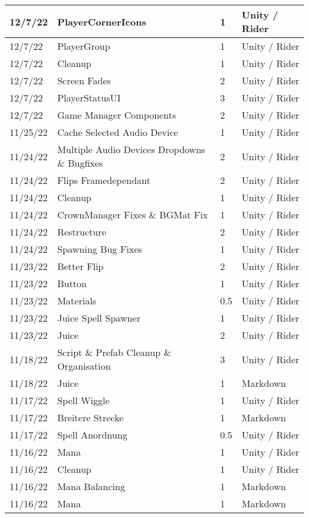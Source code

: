 \begin{longtable}{|p{1.5cm}|p{6cm}|p{1.2cm}|p{2.7cm}|}
	12/7/22 & PlayerCornerIcons & 1 & Unity / Rider \\ \hline
	12/7/22 & PlayerGroup & 1 & Unity / Rider \\ \hline
	12/7/22 & Cleanup & 1 & Unity / Rider \\ \hline
	12/7/22 & Screen Fades & 2 & Unity / Rider \\ \hline
	12/7/22 & PlayerStatusUI & 3 & Unity / Rider \\ \hline
	12/7/22 & Game Manager Components & 2 & Unity / Rider \\ \hline
	11/25/22 & Cache Selected Audio Device & 1 & Unity / Rider \\ \hline
	11/24/22 & Multiple Audio Devices Dropdowns \& Bugfixes & 2 & Unity / Rider \\ \hline
	11/24/22 & Flips Framedependant & 2 & Unity / Rider \\ \hline
	11/24/22 & Cleanup & 1 & Unity / Rider \\ \hline
	11/24/22 & CrownManager Fixes \& BGMat Fix & 1 & Unity / Rider \\ \hline
	11/24/22 & Restructure & 2 & Unity / Rider \\ \hline
	11/24/22 & Spawning Bug Fixes & 1 & Unity / Rider \\ \hline
	11/23/22 & Better Flip & 2 & Unity / Rider \\ \hline
	11/23/22 & Button & 1 & Unity / Rider \\ \hline
	11/23/22 & Materials & 0.5 & Unity / Rider \\ \hline
	11/23/22 & Juice Spell Spawner & 1 & Unity / Rider \\ \hline
	11/23/22 & Juice & 2 & Unity / Rider \\ \hline
	11/18/22 & Script \& Prefab Cleanup \& Organisation & 3 & Unity / Rider \\ \hline
	11/18/22 & Juice & 1 & Markdown \\ \hline
	11/17/22 & Spell Wiggle & 1 & Unity / Rider \\ \hline
	11/17/22 & Breitere Strecke & 1 & Markdown \\ \hline
	11/17/22 & Spell Anordnung & 0.5 & Unity / Rider \\ \hline
	11/16/22 & Mana & 1 & Unity / Rider \\ \hline
	11/16/22 & Cleanup & 1 & Unity / Rider \\ \hline
	11/16/22 & Mana Balancing & 1 & Markdown \\ \hline
	11/16/22 & Mana & 1 & Markdown \\ \hline

\end{longtable}
